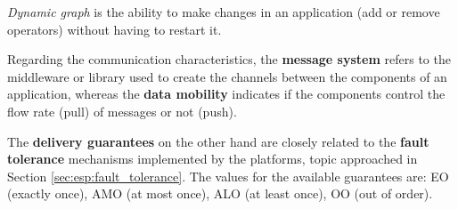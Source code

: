 \documentclass[ppgc,diss,english]{iiufrgs}
\begin{document}
\emph{Dynamic graph} is the ability to make changes in an application (add or remove operators) without having to restart it.

Regarding the communication characteristics, the \textbf{message system} refers to the middleware or library used to create the channels between the components of an application, whereas the \textbf{data mobility} indicates if the components control the flow rate (pull) of messages or not (push).

The \textbf{delivery guarantees} on the other hand are closely related to the \textbf{fault tolerance} mechanisms implemented by the platforms, topic approached in Section \ref{sec:esp:fault_tolerance}. The values for the available guarantees are: EO (exactly once), AMO (at most once), ALO (at least once), OO (out of order).
\end{document}

